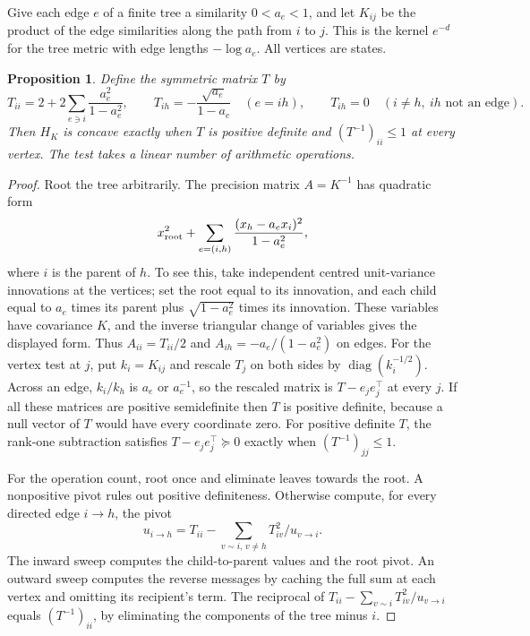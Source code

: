 \documentclass[11pt,a4paper]{article}
\newtheorem{proposition}[theorem]{Proposition}
\theoremstyle{remark}
\DeclareMathOperator{\diag}{diag}
\begin{document}
Give each edge $e$ of a finite tree a similarity $0<a_e<1$, and let $K_{ij}$ be the product of the edge similarities along the path from $i$ to $j$. This is the kernel $e^{-d}$ for the tree metric with edge lengths $-\log a_e$. All vertices are states.

\begin{proposition}\label{prop:trees}
Define the symmetric matrix $T$ by
\[
 T_{ii}=2+2\sum_{e\ni i}\frac{a_e^2}{1-a_e^2},\qquad
 T_{ih}=-\frac{\sqrt{a_e}}{1-a_e}\quad(e=ih),
 \qquad T_{ih}=0\quad(i\ne h,\ ih\text{ not an edge}).
\]
Then $H_K$ is concave exactly when $T$ is positive definite and $(T^{-1})_{ii}\le1$ at every vertex. The test takes a linear number of arithmetic operations.
\end{proposition}

\begin{proof}
Root the tree arbitrarily. The precision matrix $A=K^{-1}$ has quadratic form
\[
 x_{\rm root}^2+\sum_{e=(i,h)}\frac{(x_h-a_e x_i)^2}{1-a_e^2},
\]
where $i$ is the parent of $h$. To see this, take independent centred unit-variance innovations at the vertices; set the root equal to its innovation, and each child equal to $a_e$ times its parent plus $\sqrt{1-a_e^2}$ times its innovation. These variables have covariance $K$, and the inverse triangular change of variables gives the displayed form. Thus $A_{ii}=T_{ii}/2$ and $A_{ih}=-a_e/(1-a_e^2)$ on edges.
For the vertex test at $j$, put $k_i=K_{ij}$ and rescale $T_j$ on both sides by $\diag(k_i^{-1/2})$. Across an edge, $k_i/k_h$ is $a_e$ or $a_e^{-1}$, so the rescaled matrix is $T-e_j e_j^{\top}$ at every $j$. If all these matrices are positive semidefinite then $T$ is positive definite, because a null vector of $T$ would have every coordinate zero. For positive definite $T$, the rank-one subtraction satisfies $T-e_j e_j^{\top}\succeq0$ exactly when $(T^{-1})_{jj}\le1$.

For the operation count, root once and eliminate leaves towards the root. A nonpositive pivot rules out positive definiteness. Otherwise compute, for every directed edge $i\to h$, the pivot
\[
 u_{i\to h}=T_{ii}-\sum_{v\sim i,\,v\ne h}T_{iv}^2/u_{v\to i}.
\]
The inward sweep computes the child-to-parent values and the root pivot. An outward sweep computes the reverse messages by caching the full sum at each vertex and omitting its recipient's term. The reciprocal of $T_{ii}-\sum_{v\sim i}T_{iv}^2/u_{v\to i}$ equals $(T^{-1})_{ii}$, by eliminating the components of the tree minus $i$.
\end{proof}
\end{document}
